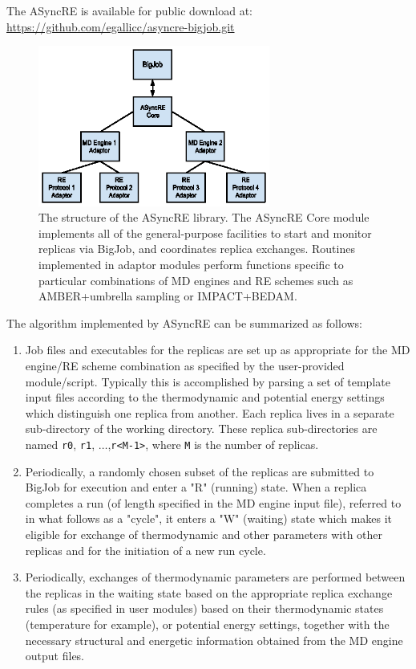 \documentclass{sig-alternate}
\begin{document}
The ASyncRE is available for public download at: \\
\url{https://github.com/egallicc/asyncre-bigjob.git}


\begin{figure}
\includegraphics[width=3in]{asyncre.eps}
\caption{\label{fig:aRE_chart}The structure of the ASyncRE
  library. The ASyncRE Core module implements all of the
  general-purpose facilities to start and monitor replicas via BigJob,
  and coordinates replica exchanges. Routines implemented in adaptor
  modules perform functions specific to particular combinations of MD
  engines and RE schemes such as AMBER+umbrella sampling or IMPACT+BEDAM.  }
\end{figure}


The algorithm implemented by ASyncRE can be summarized as follows:

\begin{enumerate}

\item Job files and executables for the replicas are set up as
  appropriate for the MD engine/RE scheme combination as specified by
  the user-provided module/script. Typically this is accomplished by parsing a
  set of template input files according to the thermodynamic and
  potential energy settings which distinguish one replica from
  another. Each replica lives in a separate sub-directory of the
  working directory. These replica sub-directories are named
  \verb+r0+, {\tt r1}, $\ldots$,\verb+r<M-1>+, where \verb+M+ is the
  number of replicas.

\item Periodically, a randomly chosen subset of the replicas are
  submitted to BigJob for execution and enter a "R" (running)
  state. When a replica completes a run (of length specified in the MD
  engine input file), referred to in what follows as a "cycle", it
  enters a "W" (waiting) state which makes it eligible for exchange of
  thermodynamic and other parameters with other replicas and for the
  initiation of a new run cycle.

\item Periodically, exchanges of thermodynamic parameters are
  performed between the replicas in the waiting state based on the
  appropriate replica exchange rules (as specified in user modules)
  based on their thermodynamic states (temperature for example), or
  potential energy settings, together with the necessary structural
  and energetic information obtained from the MD engine output files.

\end{enumerate}
\end{document}
